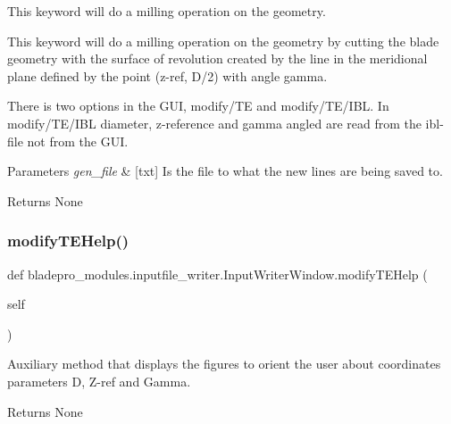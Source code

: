 This keyword will do a milling operation on the geometry. 

This keyword will do a milling operation on the geometry by cutting the blade geometry with the surface of revolution created by the line in the meridional plane defined by the point (z-\/ref, D/2) with angle gamma.

There is two options in the G\+UI, modify/\+TE and modify/\+T\+E/\+I\+BL. In modify/\+T\+E/\+I\+BL diameter, z-\/reference and gamma angled are read from the ibl-\/file not from the G\+UI.


\begin{DoxyParams}{Parameters}
{\em gen\+\_\+file} & \mbox{[}txt\mbox{]} Is the file to what the new lines are being saved to. \\
\hline
\end{DoxyParams}
\begin{DoxyReturn}{Returns}
None 
\end{DoxyReturn}
\hypertarget{a00071_a0894116159595156b62859c796bdea1d}{}\label{a00071_a0894116159595156b62859c796bdea1d} 
\subsubsection{\texorpdfstring{modify\+T\+E\+Help()}{modifyTEHelp()}}
{\footnotesize\ttfamily def bladepro\+\_\+modules.\+inputfile\+\_\+writer.\+Input\+Writer\+Window.\+modify\+T\+E\+Help (\begin{DoxyParamCaption}\item[{}]{self }\end{DoxyParamCaption})}



Auxiliary method that displays the figures to orient the user about coordinates parameters D, Z-\/ref and Gamma. 

\begin{DoxyReturn}{Returns}
None 
\end{DoxyReturn}
\hypertarget{a00071_af311095fe10adcca5237385033dfe67b}{}\label{a00071_af311095fe10adcca5237385033dfe67b} 
